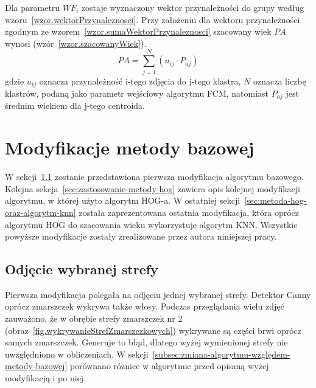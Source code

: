 \documentclass[a4paper,twoside,12pt]{book}
\begin{document}


    Dla parametru $WF_{i}$ zostaje wyznaczony wektor przynależności do grupy
    według wzoru~\ref{wzor.wektorPrzynaleznosci}.
    Przy założeniu dla wektoru przynależności zgodnym ze wzorem~\ref{wzor.sumaWektorPrzynaleznosci} szacowany wiek
    $PA$
    wynosi
    (wzór~\ref{wzor.szacowanyWiek}).
    \large
    \begin{equation}
        PA=\sum_{j=1}^{N}(u_{ij} \cdot P_{aj})
        \label{wzor.szacowanyWiek}
    \end{equation}
    \normalsize
    gdzie $u_{ij}$ oznacza przynależność i-tego zdjęcia do j-tego klastra, $N$ oznacza liczbę klastrów, podaną jako
    parametr wejściowy algorytmu FCM,
    natomiast $P_{aj}$ jest średnim wiekiem dla j-tego centroida.

    \chapter{Modyfikacje metody bazowej}\label{ch:modyfikacje-metody-bazowej}
    W sekcji~\ref{sec:odjęcie-wybranej-strefy} zostanie przedstawiona pierwsza modyfikacja algorytmu bazowego.
    Kolejna sekcja~\ref{sec:zastosowanie-metody-hog} zawiera opis kolejnej modyfikacji algorytmu, w której użyto
    algorytm HOG-a.
    W ostatniej sekcji~\ref{sec:metoda-hog-oraz-algorytm-knn} została zaprezentowana ostatnia modyfikacja, która oprócz algorytmu HOG do szacowania
    wieku wykorzystuje algorytm KNN.
    Wszystkie powyższe modyfikacje zostały zrealizowane przez autora niniejszej pracy.

    \section{Odjęcie wybranej strefy}\label{sec:odjęcie-wybranej-strefy}
    Pierwsza modyfikacja polegała na odjęciu jednej wybranej strefy. Detektor Canny oprócz zmarszczek
    wykrywa także włosy. Podczas przeglądania wielu zdjęć zauważono, że w obrębie
    strefy zmarszczek nr 2 (obraz~\ref{fig.wykrywanieStrefZmarszczkowych}) wykrywane są części brwi oprócz samych
    zmarszczek. Generuje to błąd, dlatego wyżej wymienionej strefy nie uwzględniono w obliczeniach.
    W sekcji~\ref{subsec:zmiana-algorytmu-względem-metody-bazowej} porównano różnice w algorytmie przed opisaną wyżej
    modyfikacją i po niej.
\end{document}
